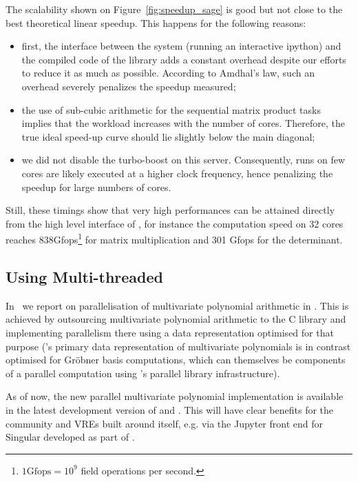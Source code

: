 \documentclass{deliverablereport}
\begin{document}
The scalability shown on Figure~\ref{fig:speedup_sage} is good but not close to the best theoretical linear
speedup. This happens for the following reasons:
\begin{itemize}
\item first, the interface between the system \SageMath (running an interactive ipython) and the compiled code of the
  library adds a constant overhead despite our efforts to reduce it as much as possible. According to Amdhal's law,
  such an overhead severely penalizes the speedup measured;
\item the use of sub-cubic arithmetic for the sequential matrix product tasks implies that the workload increases with
  the number of cores. Therefore, the true ideal speed-up curve should lie slightly below the main diagonal;
\item we did not disable the turbo-boost on this server. Consequently, runs on few cores are likely executed at a higher
  clock frequency, hence penalizing the speedup for large numbers of cores.
\end{itemize}

Still, these timings show that very high performances can be attained directly from the high level interface of
\SageMath, for instance the computation speed on 32 cores reaches 838Gfops\footnote{$1\text{Gfops} = 10^9$ field
  operations per second.} for matrix multiplication and 301 Gfops for
the determinant.

\subsection{Using Multi-threaded \Singular}

In~ we report on parallelisation of
multivariate polynomial arithmetic in \Singular. This is achieved by
outsourcing multivariate polynomial arithmetic to the C \FLINT library
and implementing parallelism there using a data representation
optimised for that purpose (\Singular's primary data representation of
multivariate polynomials is in contrast optimised for Gr\"{o}bner basis
computations, which can themselves be components of a parallel computation
using \Singular's parallel library infrastructure).

As of now, the new parallel multivariate polynomial implementation is available in the
latest development version of \FLINT and \Singular. This will have clear benefits for the
\Singular community and VREs built around \Singular itself, e.g. via the Jupyter front end
for Singular developed as part of .
\end{document}
